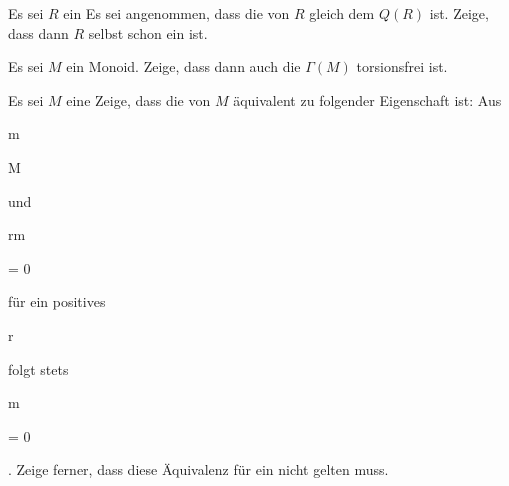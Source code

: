 {}

{


Es sei $R$ ein
 Es sei angenommen, dass die
 von $R$ gleich dem
 $Q(R)$ ist. Zeige, dass dann $R$ selbst schon ein
 ist.


}

{} {}



{}

{


Es sei $M$ ein
Monoid. Zeige, dass dann auch die
$\Gamma(M)$ torsionsfrei ist.


}

{} {}



{}

{


Es sei $M$ eine
Zeige, dass die
von $M$ äquivalent zu folgender Eigenschaft ist: Aus


\mavergleichskette

{\vergleichskette

{ m
}

{ \in }{ M
}

{  }{
}

{    }{
}

{   }{
}

}
{}{}{}
und


\mavergleichskette

{\vergleichskette

{ rm
}

{ = }{ 0
}

{  }{
}

{    }{
}

{   }{
}

}
{}{}{}
für ein positives


\mavergleichskette

{\vergleichskette

{ r
}

{ \in }{ \N
}

{  }{
}

{    }{
}

{   }{
}

}
{}{}{}
folgt stets


\mavergleichskette

{\vergleichskette

{ m
}

{ = }{ 0
}

{  }{
}

{    }{
}

{   }{
}

}
{}{}{.}
Zeige ferner, dass diese Äquivalenz für ein
nicht gelten muss.


}

